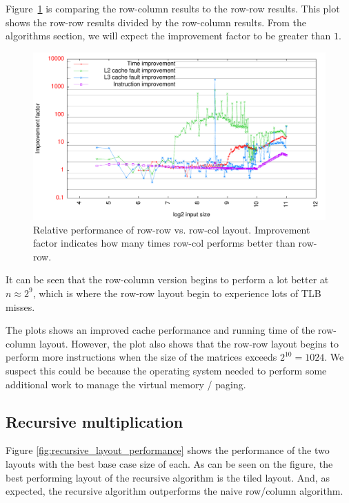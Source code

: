 Figure~\ref{fig:rowcol_vs_rowrow} is comparing the row-column results
to the row-row results. This plot shows the row-row results divided by
the row-column results. From the algorithms section, we will expect
the improvement factor to be greater than $1$.
\begin{figure}[h!]
  \centering
  \includegraphics[width=\textwidth]{plots/rowcol_vs_rowrow}
  \caption{Relative performance of row-row vs. row-col
    layout. Improvement factor indicates how many times row-col
    performs better than row-row.}
  \label{fig:rowcol_vs_rowrow}
\end{figure}

It can be seen that the row-column version begins to perform a lot
better at $n \approx 2^9$, which is where the row-row layout begin to
experience lots of TLB misses.

The plots shows an improved cache performance and running time of the
row-column layout. However, the plot also shows that the row-row
layout begins to perform more instructions when the size of the
matrices exceeds $2^{10} = 1024$. We suspect this could be because the
operating system needed to perform some additional work to manage the
virtual memory / paging.

\subsection{Recursive multiplication}

Figure \ref{fig:recursive_layout_performance} shows the performance of the two layouts with the best base case size of each. As can be seen on the figure, the best performing layout of the recursive algorithm is the tiled layout. And, as expected, the recursive algorithm outperforms the naive row/column algorithm.

